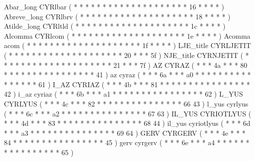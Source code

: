 \makechr Abar_long    CYRlbar           ( *  *       *  *   *  *  *  *     *  *  *  *  *     *  *  *  *     *  *  *     16  *  *    *  *   )
\makechr Abreve_long  CYRlbrv           ( *  *       *  *   *  *  *  *     *  *  *  *  *     *  *  *  *     *  *  *     18  *  *    *  *   )
\makechr Atilde_long  CYRltld           ( *  *       *  *   *  *  *  *     *  *  *  *  *     *  *  *  *     *  *  *     1c  *  *    *  *   )
\makechr Alcomma      CYRlcom           ( *  *       *  *   *  *  *  *     *  *  *  *  *     *  *  *  *     *  *  *     1e  *  *    *  *   )
\makeacc Acomma       acom              ( *  *       *  *   *  *  *  *     *  *  *  *  *     *  *  *  *     *  *  *     1f  *  *    *  *   )
%
\makechr LJE_title    CYRLJETIT         ( *  *       *  *   *  *  *  *     *  *  *  *  *     *  *  *  *     *  *  *     20  *  *    *  5f  )%
\makechr NJE_title    CYRNJETIT         ( *  *       *  *   *  *  *  *     *  *  *  *  *     *  *  *  *     *  *  *     21  *  *    *  7f  )%
%
\makeCOD AZ           CYRAZ             ( *  *       *  4a  *  *  *  80    *  *  *  *  *     *  *  *  *     *  *  *     *   *  *    *  41  )
\makecod az           cyraz             ( *  *       *  6a  *  *  *  a0    *  *  *  *  *     *  *  *  *     *  *  *     *   *  *    *  61  )
\makeCOD I_AZ         CYRIAZ            ( *  *       *  4b  *  *  *  81    *  *  *  *  *     *  *  *  *     *  *  *     *   *  *    *  42  )
\makecod i_az         cyriaz            ( *  *       *  6b  *  *  *  a1    *  *  *  *  *     *  *  *  *     *  *  *     *   *  *    *  62  )
\makeCOD L_YUS        CYRLYUS           ( *  *       *  4c  *  *  *  82    *  *  *  *  *     *  *  *  *     *  *  *     *   *  *    66 43  )
\makecod l_yus        cyrlyus           ( *  *       *  6c  *  *  *  a2    *  *  *  *  *     *  *  *  *     *  *  *     *   *  *    67 63  )
\makeCOD IL_YUS       CYRIOTLYUS        ( *  *       *  4d  *  *  *  83    *  *  *  *  *     *  *  *  *     *  *  *     *   *  *    68 44  )
\makecod il_yus       cyriotlyus        ( *  *       *  6d  *  *  *  a3    *  *  *  *  *     *  *  *  *     *  *  *     *   *  *    69 64  )
\makeCOD GERV         CYRGERV           ( *  *       *  4e  *  *  *  84    *  *  *  *  *     *  *  *  *     *  *  *     *   *  *    *  45  )%
\makecod gerv         cyrgerv           ( *  *       *  6e  *  *  *  a4    *  *  *  *  *     *  *  *  *     *  *  *     *   *  *    *  65  )%

